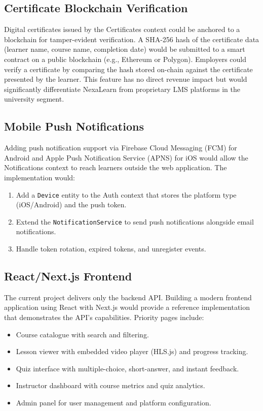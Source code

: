 \subsection{Certificate Blockchain Verification}

Digital certificates issued by the Certificates context could be anchored to a blockchain for tamper-evident verification. A SHA-256 hash of the certificate data (learner name, course name, completion date) would be submitted to a smart contract on a public blockchain (e.g., Ethereum or Polygon). Employers could verify a certificate by comparing the hash stored on-chain against the certificate presented by the learner. This feature has no direct revenue impact but would significantly differentiate NexaLearn from proprietary LMS platforms in the university segment.

\subsection{Mobile Push Notifications}

Adding push notification support via Firebase Cloud Messaging (FCM) for Android and Apple Push Notification Service (APNS) for iOS would allow the Notifications context to reach learners outside the web application. The implementation would:

\begin{enumerate}
  \item Add a \texttt{Device} entity to the Auth context that stores the platform type (iOS/Android) and the push token.
  \item Extend the \texttt{NotificationService} to send push notifications alongside email notifications.
  \item Handle token rotation, expired tokens, and unregister events.
\end{enumerate}

\subsection{React/Next.js Frontend}

The current project delivers only the backend API. Building a modern frontend application using React with Next.js would provide a reference implementation that demonstrates the API's capabilities. Priority pages include:

\begin{itemize}
  \item Course catalogue with search and filtering.
  \item Lesson viewer with embedded video player (HLS.js) and progress tracking.
  \item Quiz interface with multiple-choice, short-answer, and instant feedback.
  \item Instructor dashboard with course metrics and quiz analytics.
  \item Admin panel for user management and platform configuration.
\end{itemize}

